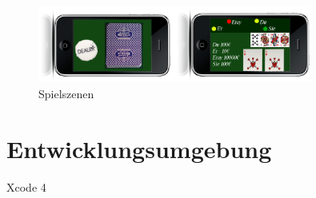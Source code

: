 \documentclass[a4paper,12pt,bibtotoc, parskip=full]{article}
\begin{document}
\begin{figure}[!h]
    \centering
    \includegraphics[width=0.8\textwidth]{Fig2}%
\caption{Spielszenen}
\end{figure} 



\newpage

\section{Entwicklungsumgebung}
Xcode 4
\end{document}
